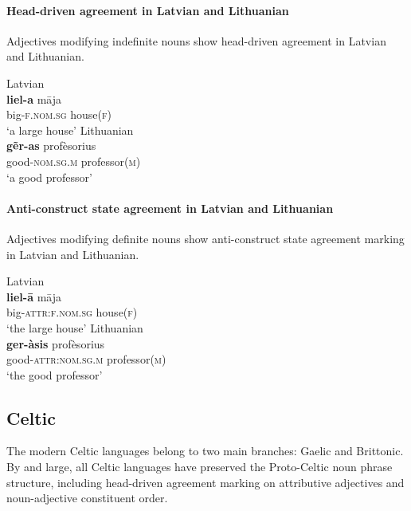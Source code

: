 \paragraph*{Head\hyp{}driven agreement in Latvian and Lithuanian} 
Adjectives modifying indefinite nouns show head\hyp{}driven agreement in Latvian and Lithuanian.
\begin{exe}
\ex 
\begin{xlist}
\ex \rm{Latvian \citep[example from][122]{dahl2015a}}\\
\gll 	\textbf{liel-a} māja\\
	big-\textsc{f.nom.sg} house(\textsc{f})\\
\glt	‘a large house’
\ex \rm{Lithuanian \citep[13]{bechert1993}}\\
\gll 	\textbf{gẽr-as}			profèsorius\\
	good-\textsc{nom.sg.m} professor(\textsc{m})\\
\glt	‘a good professor’
\end{xlist}
\end{exe}

\paragraph*{Anti\hyp{}construct state agreement in Latvian and Lithuanian}
Adjectives modifying definite nouns show anti\hyp{}construct state agreement marking in Latvian and Lithuanian.
\begin{exe}
\ex 
\begin{xlist}	
\ex \rm{Latvian \citep[example from][122]{dahl2015a}}\\
\gll 	\textbf{liel-ā} māja\\
	big-\textsc{attr:f.nom.sg} house(\textsc{f})\\
\glt	‘the large house’
\ex \rm{Lithuanian \citep[13]{bechert1993}}\\
\gll 	\textbf{ger-àsis}		profèsorius\\
	good-\textsc{attr:nom.sg.m}	professor(\textsc{m})\\
\glt	‘the good professor’
\end{xlist}
\end{exe}

\subsection{Celtic}
The modern Celtic languages belong to two main branches: Gaelic and Brittonic. By and large, all Celtic languages have preserved the Proto\hyp{}Celtic noun phrase structure, including head\hyp{}driven agreement marking on attributive adjectives and noun-adjective constituent order.

